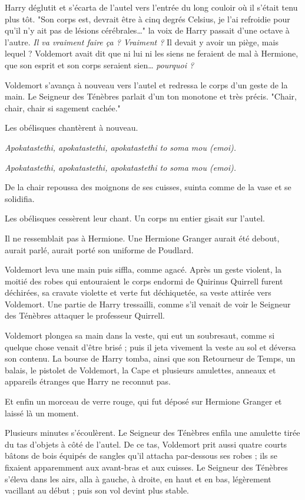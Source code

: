 Harry déglutit et s'écarta de l'autel vers l'entrée du long couloir où il s'était tenu plus tôt. "Son corps est, devrait être à cinq degrés Celsius, je l'ai refroidie pour qu'il n'y ait pas de lésions cérébrales…" la voix de Harry passait d'une octave à l'autre. \emph{Il va vraiment faire ça ? Vraiment ?}  Il devait y avoir un piège, mais lequel ? Voldemort avait dit que ni lui ni les siens ne feraient de mal à Hermione, que son esprit et son corps seraient sien… \emph{pourquoi ?} 

Voldemort s'avança à nouveau vers l'autel et redressa le corps d'un geste de la main. Le Seigneur des Ténèbres parlait d'un ton monotone et très précis. "Chair, chair, chair si sagement cachée."

Les obélisques chantèrent à nouveau.

\emph{Apokatastethi, apokatastethi, apokatastethi to soma mou (emoi).} 

\emph{Apokatastethi, apokatastethi, apokatastethi to soma mou (emoi).} 

De la chair repoussa des moignons de ses cuisses, suinta comme de la vase et se solidifia.

Les obélisques cessèrent leur chant. Un corps nu entier gisait sur l'autel.

Il ne ressemblait pas à Hermione. Une Hermione Granger aurait été debout, aurait parlé, aurait porté son uniforme de Poudlard.

Voldemort leva une main puis siffla, comme agacé. Après un geste violent, la moitié des robes qui entouraient le corps endormi de Quirinus Quirrell furent déchirées, sa cravate violette et verte fut déchiquetée, sa veste attirée vers Voldemort. Une partie de Harry tressailli, comme s'il venait de voir le Seigneur des Ténèbres attaquer le professeur Quirrell.

Voldemort plongea sa main dans la veste, qui eut un soubresaut, comme si quelque chose venait d'être brisé ; puis il jeta vivement la veste au sol et déversa son contenu. La bourse de Harry tomba, ainsi que son Retourneur de Temps, un balais, le pistolet de Voldemort, la Cape et plusieurs amulettes, anneaux et appareils étranges que Harry ne reconnut pas.

Et enfin un morceau de verre rouge, qui fut déposé sur Hermione Granger et laissé là un moment.

Plusieurs minutes s'écoulèrent. Le Seigneur des Ténèbres enfila une amulette tirée du tas d'objets à côté de l'autel. De ce tas, Voldemort prit aussi quatre courts bâtons de bois équipés de sangles qu'il attacha par-dessous ses robes ; ils se fixaient apparemment aux avant-bras et aux cuisses. Le Seigneur des Ténèbres s'éleva dans les airs, alla à gauche, à droite, en haut et en bas, légèrement vacillant au début ; puis son vol devint plus stable.

